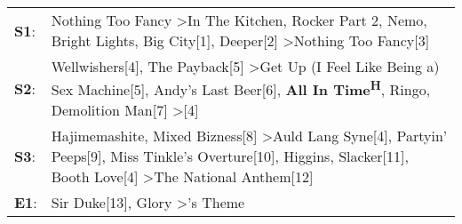 \begin{supertabular}{p{0.03\textwidth}p{0.92\textwidth}}
 \textbf{S1}:  &                                                                                                    Nothing Too Fancy\textsuperscript{} \textgreater \enspace In The Kitchen\textsuperscript{}, \enspace Rocker Part 2\textsuperscript{}, \enspace Nemo\textsuperscript{}, \enspace Bright Lights, Big City[1]\textsuperscript{}, \enspace Deeper[2]\textsuperscript{} \textgreater \enspace Nothing Too Fancy[3]\textsuperscript{}  \enspace  \\
 \textbf{S2}:  &                                  Wellwishers[4]\textsuperscript{}, \enspace The Payback[5]\textsuperscript{} \textgreater \enspace Get Up (I Feel Like Being a) Sex Machine[5]\textsuperscript{}, \enspace Andy's Last Beer[6]\textsuperscript{}, \enspace \textbf{All In Time\textsuperscript{H}}, \enspace Ringo\textsuperscript{}, \enspace Demolition Man[7]\textsuperscript{} \textgreater {}[4]\textsuperscript{}  \enspace  \\
 \textbf{S3}:  &  Hajimemashite\textsuperscript{}, \enspace Mixed Bizness[8]\textsuperscript{} \textgreater \enspace Auld Lang Syne[4]\textsuperscript{}, \enspace Partyin' Peeps[9]\textsuperscript{}, \enspace Miss Tinkle's Overture[10]\textsuperscript{}, \enspace Higgins\textsuperscript{}, \enspace Slacker[11]\textsuperscript{}, \enspace Booth Love[4]\textsuperscript{} \textgreater \enspace The National Anthem[12]\textsuperscript{}  \enspace  \\
 \textbf{E1}:  &                                                                                                                                                                                                                                                                                                                Sir Duke[13]\textsuperscript{}, \enspace Glory\textsuperscript{} \textgreater {}'s Theme\textsuperscript{}  \enspace  \\
\end{supertabular}
